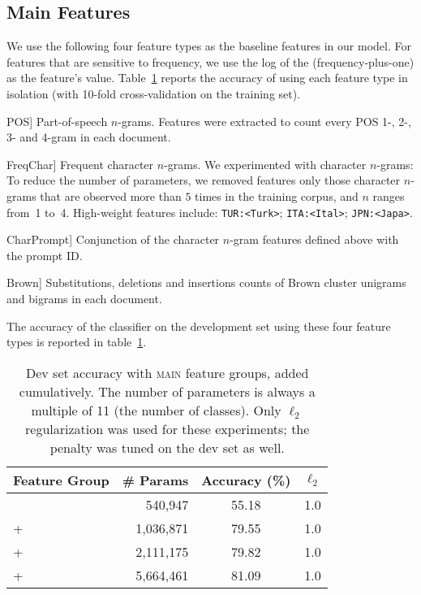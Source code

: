 \documentclass[11pt,letterpaper]{article}
\newcommand{\ignore}[1]{}
\newcommand{\tref}[1]{table~\ref{#1}}
\newcommand{\Tref}[1]{Table~\ref{#1}}
\newcommand{\feat}[1]{\textsmaller[.5]{\textsf{#1}}} %
\begin{document}
\subsection{Main Features}
\label{sec:mainfeats}
We use the following four feature types as the baseline features in our
model.  For features that are sensitive to frequency, we use the log of the (frequency-plus-one) as
the feature's value.  \Tref{tbl:mainfeats} reports the accuracy of using each feature type in
isolation (with 10-fold cross-validation on the training set).


\begin{compactdesc}
\item[\feat{POS}] Part-of-speech $n$-grams.  Features were extracted
  to count every POS 1-, 2-, 3- and 4-gram in each
  document. \ignore{CHI:IN PRP VBD, ARA:NN VBZ, KOR:DT JJ} 
\item[\feat{FreqChar}] Frequent character $n$-grams.  We experimented
  with character $n$-grams: To reduce the number of parameters, we removed features
  only those character $n$-grams that are observed more
  than $5$ times in the training corpus, and $n$ ranges from~1
    to~4. High-weight features include: {\tt TUR:<Turk>}; {\tt ITA:<Ital>}; {\tt JPN:<Japa>}.
\item[\feat{CharPrompt}] Conjunction of the character $n$-gram
  features defined above with the prompt ID.
\item[\feat{Brown}] Substitutions, deletions and insertions counts of Brown cluster 
unigrams and bigrams in each document.\ignore{in top-30 features Brown features occur up to 5 times in 10 out of 11 L1s (all except Arabic)} 
\end{compactdesc}
\noindent
The accuracy of the classifier on the development set using these four
feature types is reported in \tref{tbl:mainfeats}.

\begin{table}[hbt]
\small\centering
\begin{tabular}{lrcc}
\textbf{Feature Group} & \multicolumn{1}{c}{\textbf{\# Params}} & \textbf{Accuracy (\%)} & \textbf{$\ell_2$} \\
\hline
\feat{POS} & 540,947 & 55.18 & 1.0 \\
+ \feat{FreqChar} & 1,036,871 & 79.55 & 1.0 \\ 
\quad + \feat{CharPrompt} & 2,111,175 & 79.82 & 1.0 \\ 
\qquad + \feat{Brown} & 5,664,461 & 81.09 & 1.0 \\
\end{tabular}
\caption{Dev set accuracy with \textsc{main} feature groups, added cumulatively. 
  The number of parameters is always a multiple of 11 (the number of classes). 
  Only $\ell_2$ regularization was used for these experiments; 
  the penalty was tuned on the dev set as well.}
\label{tbl:mainfeats}
\end{table}
\end{document}
